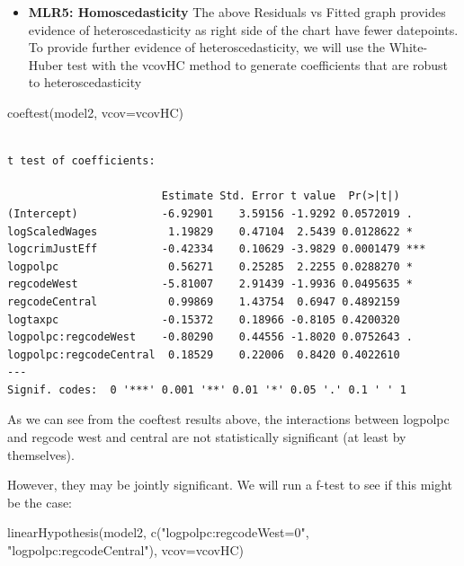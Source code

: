 \documentclass[]{article}
\newenvironment{Shaded}{}{}
\newcommand{\DataTypeTok}[1]{#1}
\newcommand{\KeywordTok}[1]{\textcolor[rgb]{0.00,0.00,1.00}{#1}}
\newcommand{\NormalTok}[1]{#1}
\newcommand{\StringTok}[1]{\textcolor[rgb]{0.00,0.50,0.50}{#1}}
\providecommand{\tightlist}{%
  \setlength{\itemsep}{0pt}\setlength{\parskip}{0pt}}
\begin{document}
\begin{itemize}
\tightlist
\item
  \textbf{MLR5: Homoscedasticity} The above Residuals vs Fitted graph
  provides evidence of heteroscedasticity as right side of the chart
  have fewer datepoints. To provide further evidence of
  heteroscedasticity, we will use the White-Huber test with the vcovHC
  method to generate coefficients that are robust to heteroscedasticity
\end{itemize}

\begin{Shaded}
\begin{Highlighting}[]
\KeywordTok{coeftest}\NormalTok{(model2, }\DataTypeTok{vcov=}\NormalTok{vcovHC)}
\end{Highlighting}
\end{Shaded}

\begin{verbatim}

t test of coefficients:

                        Estimate Std. Error t value  Pr(>|t|)    
(Intercept)             -6.92901    3.59156 -1.9292 0.0572019 .  
logScaledWages           1.19829    0.47104  2.5439 0.0128622 *  
logcrimJustEff          -0.42334    0.10629 -3.9829 0.0001479 ***
logpolpc                 0.56271    0.25285  2.2255 0.0288270 *  
regcodeWest             -5.81007    2.91439 -1.9936 0.0495635 *  
regcodeCentral           0.99869    1.43754  0.6947 0.4892159    
logtaxpc                -0.15372    0.18966 -0.8105 0.4200320    
logpolpc:regcodeWest    -0.80290    0.44556 -1.8020 0.0752643 .  
logpolpc:regcodeCentral  0.18529    0.22006  0.8420 0.4022610    
---
Signif. codes:  0 '***' 0.001 '**' 0.01 '*' 0.05 '.' 0.1 ' ' 1
\end{verbatim}

As we can see from the coeftest results above, the interactions between
logpolpc and regcode west and central are not statistically significant
(at least by themselves).

However, they may be jointly significant. We will run a f-test to see if
this might be the case:

\begin{Shaded}
\begin{Highlighting}[]
\KeywordTok{linearHypothesis}\NormalTok{(model2, }\KeywordTok{c}\NormalTok{(}\StringTok{"logpolpc:regcodeWest=0"}\NormalTok{, }\StringTok{"logpolpc:regcodeCentral"}\NormalTok{), }\DataTypeTok{vcov=}\NormalTok{vcovHC)}
\end{Highlighting}
\end{Shaded}
\end{document}
